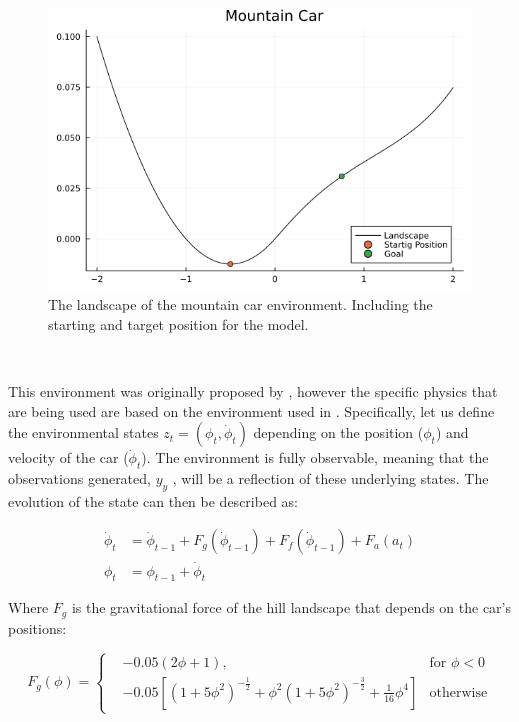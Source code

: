 \documentclass{article}
\begin{document}
\begin{figure}[htbp]
    \centering
    \includegraphics[scale=0.5]{images/mountain_car_plot.png}
    \caption{The landscape of the mountain car environment. Including the starting and target position for the model.}
    \label{fig:markov_blanket}
\end{figure}

\

This environment was originally proposed by \citet{moore90efficientmemory}, however the specific physics that are being used are based on the environment used in \citet{ueltzhoffer2018deep, van2019simulating}. Specifically, let us define the environmental states $z_t = (\phi_t, \dot{\phi}_t)$ depending on the position ($\phi_t$) and velocity of the car ($\dot{\phi}_t$). The environment is fully observable, meaning that the observations generated, $y_y$ , will be a reflection of these underlying states. The evolution of the state can then be described as:

\begin{equation}
	\begin{aligned}
		\dot{\phi}_t &= \dot{\phi}_{t-1} + F_g(\dot{\phi}_{t-1}) + F_f(\dot{\phi}_{t-1}) + F_a(a_t) \\
		\phi_t &= \phi_{t-1} + \dot{\phi}_t
	\end{aligned}
\end{equation}

Where $F_g$ is the gravitational force of the hill landscape that depends on the car's positions:

\begin{equation}
F_g(\phi) = \left\{
	\begin{aligned}
		&- 0.05 (2 \phi + 1), \ & \text{for } \phi < 0 \\
		&- 0.05 \left[ (1 + 5\phi^2 )^{-\frac{1}{2}} + \phi^2( 1 + 5\phi^2)^{-\frac{3}{2}} + \frac{1}{16} \phi^4\right] & \text{otherwise}
	\end{aligned}
	\right.
\end{equation}
\end{document}
